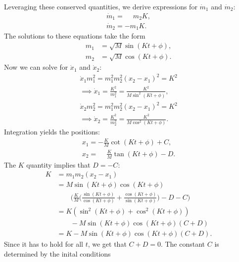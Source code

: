 \documentclass[english,master]{liumaiex}
\theoremstyle{plain}
\theoremstyle{definition}
\begin{document}
%
Leveraging these conserved quantities, we derive expressions for $\dot{m}_1$ and $\dot{m}_2$:
\begin{equation}
\begin{aligned}
	\dot{m}_1 = \phantom{-}m_2K, \\
	\dot{m}_2 = -m_1K.
\end{aligned}
\end{equation}
%
The solutions to these equations take the form
\begin{equation}
\begin{aligned}
	m_1 &= \sqrt{M} \sin(Kt + \phi), \\
	m_2 &= \sqrt{M} \cos(Kt + \phi).
\end{aligned}
\end{equation}
%
Now we can solve for $\dot{x}_1$ and $\dot{x}_2$:
\begin{align}
	\dot{x}_1m_1^2 = m_1^2m_2^2(x_2 - x_1)^2 = K^2 \\
	\implies
	\dot{x}_1 = \frac{K^2}{m_1^2} = \frac{K^2}{M\sin^2(Kt + \phi)}, \\
	\dot{x}_2m_2^2 = m_1^2m_2^2(x_2 - x_1)^2 = K^2 \\
	\implies
	\dot{x}_2 = \frac{K^2}{m_2^2} = \frac{K^2}{M\cos^2(Kt + \phi)}.
\end{align}
%
Integration yields the positions:
\begin{equation}
\begin{aligned}
	x_1 = -\frac{K}{M}\cot(Kt + \phi) + C,\\
	x_2 = \phantom{-}\frac{K}{M}\tan(Kt + \phi) - D.
\end{aligned}
\end{equation}
%
The $K$ quantity implies that $D = -C$:
\begin{equation}
\begin{aligned}
	K &= m_1m_2(x_2 - x_1) \\
	&= M \sin(Kt + \phi) \cos(Kt + \phi) \\
	& \qquad \Big( \frac{K}{M} \Big(\frac{\sin(Kt + \phi)}{\cos(Kt + \phi)} +
	\frac{\cos(Kt + \phi)}{\sin(Kt + \phi)}\Big) - D - C \Big) \\
	&= K(\sin^2(Kt + \phi) + \cos^2(Kt + \phi)) \\
	& \qquad - M \sin(Kt + \phi) \cos(Kt + \phi)(C + D) \\
	&= K - M \sin(Kt + \phi) \cos(Kt + \phi)(C + D).
\end{aligned}
\end{equation}
%
Since it has to hold for all $t$, we get that $C + D = 0$. The constant $C$ is determined by the inital conditions
\end{document}
